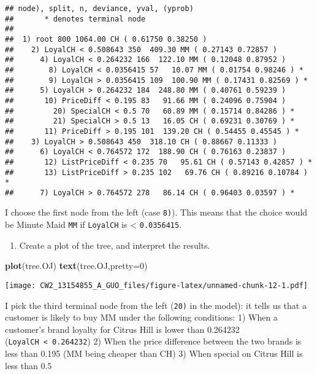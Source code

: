 \documentclass[]{article}
\newenvironment{Shaded}{\begin{snugshade}}{\end{snugshade}}
\newcommand{\KeywordTok}[1]{\textcolor[rgb]{0.13,0.29,0.53}{\textbf{#1}}}
\newcommand{\DataTypeTok}[1]{\textcolor[rgb]{0.13,0.29,0.53}{#1}}
\newcommand{\DecValTok}[1]{\textcolor[rgb]{0.00,0.00,0.81}{#1}}
\newcommand{\NormalTok}[1]{#1}
\providecommand{\tightlist}{%
  \setlength{\itemsep}{0pt}\setlength{\parskip}{0pt}}
\begin{document}
\begin{verbatim}
## node), split, n, deviance, yval, (yprob)
##       * denotes terminal node
## 
##  1) root 800 1064.00 CH ( 0.61750 0.38250 )  
##    2) LoyalCH < 0.508643 350  409.30 MM ( 0.27143 0.72857 )  
##      4) LoyalCH < 0.264232 166  122.10 MM ( 0.12048 0.87952 )  
##        8) LoyalCH < 0.0356415 57   10.07 MM ( 0.01754 0.98246 ) *
##        9) LoyalCH > 0.0356415 109  100.90 MM ( 0.17431 0.82569 ) *
##      5) LoyalCH > 0.264232 184  248.80 MM ( 0.40761 0.59239 )  
##       10) PriceDiff < 0.195 83   91.66 MM ( 0.24096 0.75904 )  
##         20) SpecialCH < 0.5 70   60.89 MM ( 0.15714 0.84286 ) *
##         21) SpecialCH > 0.5 13   16.05 CH ( 0.69231 0.30769 ) *
##       11) PriceDiff > 0.195 101  139.20 CH ( 0.54455 0.45545 ) *
##    3) LoyalCH > 0.508643 450  318.10 CH ( 0.88667 0.11333 )  
##      6) LoyalCH < 0.764572 172  188.90 CH ( 0.76163 0.23837 )  
##       12) ListPriceDiff < 0.235 70   95.61 CH ( 0.57143 0.42857 ) *
##       13) ListPriceDiff > 0.235 102   69.76 CH ( 0.89216 0.10784 ) *
##      7) LoyalCH > 0.764572 278   86.14 CH ( 0.96403 0.03597 ) *
\end{verbatim}

I choose the first node from the left (case \texttt{8)}). This means
that the choice would be Minute Maid \texttt{MM} if \texttt{LoyalCH} is
\textless{} \texttt{0.0356415}.

\begin{enumerate}
\def\labelenumi{(\alph{enumi})}
\setcounter{enumi}{3}
\tightlist
\item
  Create a plot of the tree, and interpret the results.
\end{enumerate}

\begin{Shaded}
\begin{Highlighting}[]
\KeywordTok{plot}\NormalTok{(tree.OJ)}
\KeywordTok{text}\NormalTok{(tree.OJ,}\DataTypeTok{pretty=}\DecValTok{0}\NormalTok{)}
\end{Highlighting}
\end{Shaded}

\texttt{[image: CW2\_13154855\_A\_GUO\_files/figure-latex/unnamed-chunk-12-1.pdf]}

I pick the third terminal node from the left (\texttt{20)} in the
model): it tells us that a customer is likely to buy MM under the
following conditions: 1) When a customer's brand loyalty for Citrus Hill
is lower than 0.264232 (\texttt{LoyalCH\ \textless{}\ 0.264232}) 2) When
the price difference between the two brands is less than 0.195 (MM being
cheaper than CH) 3) When special on Citrus Hill is less than 0.5
\end{document}
